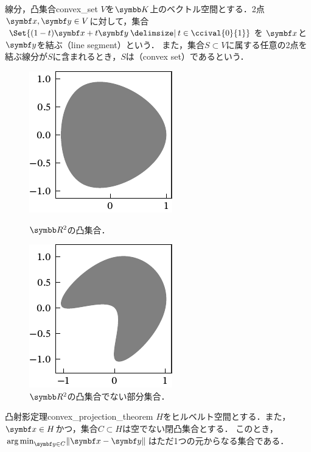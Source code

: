 \documentclass[../../main]{subfiles}
\begin{document}
\begin{definition}{線分，凸集合}{convex_set}
  \(V\)を\(\numset{K}\)上のベクトル空間とする．2点\(\vect{x},\vect{y}\in V\)に対して，集合\(\Set{(1-t)\vect{x}+t\vect{y}\given t\in\ccival{0}{1}}\)を
  \(\vect{x}\)と\(\vect{y}\)を結ぶ（line segment）という．
  また，集合\(S\subset V\)に属する任意の2点を結ぶ線分が\(S\)に含まれるとき，\(S\)は（convex set）であるという．
\end{definition}

\begin{figure}[htbp]
  \begin{minipage}{0.5\linewidth}
    \centering
    \includegraphics{convex.pdf}
    \caption{\(\numset{R}^2\)の凸集合．}
  \end{minipage}%
  \begin{minipage}{0.5\linewidth}
    \centering
    \includegraphics{non_convex.pdf}
    \caption{\(\numset{R}^2\)の凸集合でない部分集合．}
  \end{minipage}
\end{figure}

\begin{theorem}{凸射影定理}{convex_projection_theorem}
  \(H\)をヒルベルト空間とする．また，\(\vect{x}\in H\)かつ，集合\(C\subset H\)は空でない閉凸集合とする．
  このとき，\(\argmin_{\vect{y}\in C}\vnorm{\vect{x}-\vect{y}}\)はただ1つの元からなる集合である．
\end{theorem}
\end{document}
